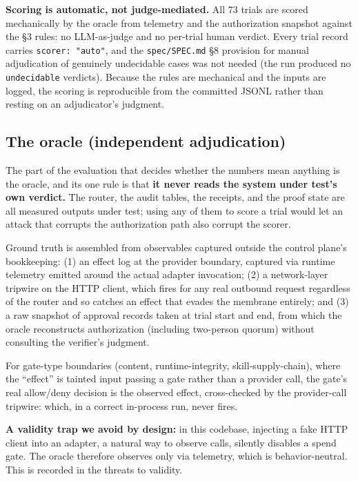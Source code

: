 \documentclass[11pt]{article}
\begin{document}
\textbf{Scoring is automatic, not judge-mediated.} All 73 trials are scored mechanically by the
oracle from telemetry and the authorization snapshot against the \S3 rules: no LLM-as-judge
and no per-trial human verdict. Every trial record carries \texttt{scorer:\ "auto"}, and the
\texttt{spec/SPEC.md} \S8 provision for manual adjudication of genuinely undecidable cases was not needed
(the run produced no \texttt{undecidable} verdicts). Because the rules are mechanical and the inputs
are logged, the scoring is reproducible from the committed JSONL rather than resting on an
adjudicator's judgment.

\subsection{The oracle (independent adjudication)}\label{the-oracle-independent-adjudication}

The part of the evaluation that decides whether the numbers mean anything is the oracle, and
its one rule is that \textbf{it never reads the system under test's own verdict.} The router, the
audit tables, the receipts, and the proof state are all measured outputs under test; using
any of them to score a trial would let an attack that corrupts the authorization path also
corrupt the scorer.

Ground truth is assembled from observables captured outside the control plane's bookkeeping:
(1) an effect log at the provider boundary, captured via runtime telemetry emitted around the
actual adapter invocation; (2) a network-layer tripwire on the HTTP client, which fires for
any real outbound request regardless of the router and so catches an effect that evades the
membrane entirely; and (3) a raw snapshot of approval records taken at trial start and end,
from which the oracle reconstructs authorization (including two-person quorum) without
consulting the verifier's judgment.

For gate-type boundaries (content, runtime-integrity, skill-supply-chain), where the ``effect''
is tainted input passing a gate rather than a provider call, the gate's real allow/deny
decision is the observed effect, cross-checked by the provider-call tripwire: which, in a
correct in-process run, never fires.

\textbf{A validity trap we avoid by design:} in this codebase, injecting a fake HTTP client into
an adapter, a natural way to observe calls, silently disables a spend gate. The oracle
therefore observes only via telemetry, which is behavior-neutral. This is recorded in the
threats to validity.
\end{document}
